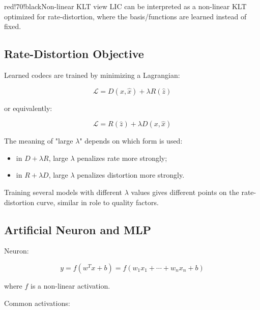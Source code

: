 \begin{calloutbox}{red!70!black}{Non-linear KLT view}
LIC can be interpreted as a non-linear KLT optimized for rate-distortion, where the basis/functions are learned instead of fixed.
\end{calloutbox}

\subsection{Rate-Distortion Objective}

Learned codecs are trained by minimizing a Lagrangian:

\[
\mathcal{L}=D(x,\hat{x})+\lambda R(\hat{z})
\]

or equivalently:

\[
\mathcal{L}=R(\hat{z})+\lambda D(x,\hat{x})
\]

The meaning of "large $\lambda$" depends on which form is used:

\begin{itemize}
  \item in $D+\lambda R$, large $\lambda$ penalizes rate more strongly;
  \item in $R+\lambda D$, large $\lambda$ penalizes distortion more strongly.
\end{itemize}

Training several models with different $\lambda$ values gives different points on the rate-distortion curve, similar in role to quality factors.

\subsection{Artificial Neuron and MLP}

Neuron:

\[
y=f(w^Tx+b)=f(w_1x_1+\cdots+w_nx_n+b)
\]

where $f$ is a non-linear activation.

Common activations:

\begin{center}
\end{center}

